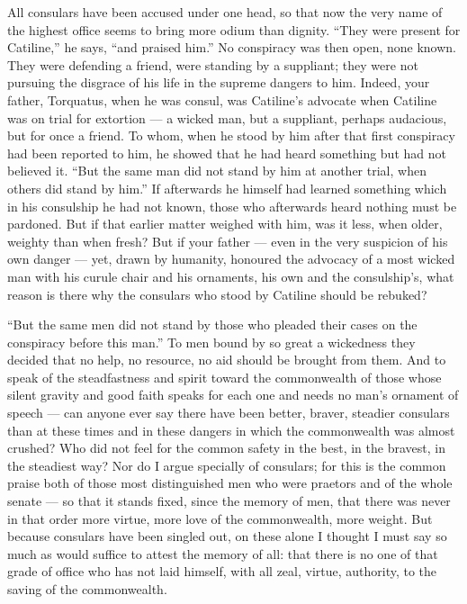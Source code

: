  All consulars have been accused under one head, so that now the very name of the highest office seems to bring more odium than dignity. ``They were present for Catiline,'' he says, ``and praised him.'' No conspiracy was then open, none known. They were defending a friend, were standing by a suppliant; they were not pursuing the disgrace of his life in the supreme dangers to him. Indeed, your father, Torquatus, when he was consul, was Catiline's advocate when Catiline was on trial for extortion --- a wicked man, but a suppliant, perhaps audacious, but for once a friend. To whom, when he stood by him after that first conspiracy had been reported to him, he showed that he had heard something but had not believed it. ``But the same man did not stand by him at another trial, when others did stand by him.'' If afterwards he himself had learned something which in his consulship he had not known, those who afterwards heard nothing must be pardoned. But if that earlier matter weighed with him, was it less, when older, weighty than when fresh? But if your father --- even in the very suspicion of his own danger --- yet, drawn by humanity, honoured the advocacy of a most wicked man with his curule chair and his ornaments, his own and the consulship's, what reason is there why the consulars who stood by Catiline should be rebuked?

 ``But the same men did not stand by those who pleaded their cases on the conspiracy before this man.'' To men bound by so great a wickedness they decided that no help, no resource, no aid should be brought from them. And to speak of the steadfastness and spirit toward the commonwealth of those whose silent gravity and good faith speaks for each one and needs no man's ornament of speech --- can anyone ever say there have been better, braver, steadier consulars than at these times and in these dangers in which the commonwealth was almost crushed? Who did not feel for the common safety in the best, in the bravest, in the steadiest way? Nor do I argue specially of consulars; for this is the common praise both of those most distinguished men who were praetors and of the whole senate --- so that it stands fixed, since the memory of men, that there was never in that order more virtue, more love of the commonwealth, more weight. But because consulars have been singled out, on these alone I thought I must say so much as would suffice to attest the memory of all: that there is no one of that grade of office who has not laid himself, with all zeal, virtue, authority, to the saving of the commonwealth.

